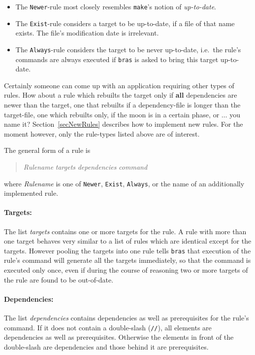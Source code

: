 \documentclass[12pt]{article}
\newcommand{\bras}{\texttt{bras}}
\newcommand{\make}{\texttt{make}}
\begin{document}
\begin{itemize}
\item 
The \texttt{Newer}-rule most closely resembles \make's notion of
\textit{up-to-date}.
\item 
The \texttt{Exist}-rule considers a target to be up-to-date,
if a file of that name exists. The file's modification date is irrelevant.
\item 
The \texttt{Always}-rule considers the target to be never
up-to-date, i.e.\ the rule's commands are always executed if
\bras{} is asked to bring this target up-to-date.
\end{itemize}

Certainly someone can come up with an application requiring other
types of rules. How about a rule which rebuilts
the target only if \textbf{all} dependencies are newer than the
target, one that rebuilts if a dependency-file is longer than the
target-file, one which rebuilts only, if the moon is in a certain
phase, or $\ldots$ you name it?  Section~\ref{secNewRules} describes
how to implement new rules. For the moment however, only the
rule-types listed above are of interest.

The general form of a rule is
\begin{quote}
\textit{Rulename} \textit{targets} \textit{dependencies} \textit{command}
\end{quote}
where \textit{Rulename} is one of \texttt{Newer}, \texttt{Exist},
\texttt{Always}, or the name of an additionally
implemented rule. 

\paragraph{Targets:}
The list \textit{targets} contains one or more targets for the rule. A
rule with more than one target behaves very similar to a list of rules
which are identical except for the targets. However pooling the
targets into one rule tells \bras{} that execution of the rule's
command will generate all the targets immediately, so that the command
is executed only once, even if during the course of reasoning two or
more targets of the rule are found to be out-of-date.

\paragraph{Dependencies:}
The list \textit{dependencies} contains dependencies as well as
prerequisites for the rule's command. If it does not contain a
double-slash (\texttt{//}), all elements are dependencies as
well as prerequisites. Otherwise the elements in front of the
double-slash are dependencies and those behind it are prerequisites.
\end{document}
